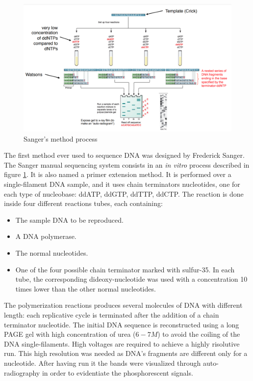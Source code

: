 \begin{figure}[h]
    \centering
    \includegraphics[width=\textwidth]{Sanger}
    \caption{Sanger's method process}
    \label{Sanger}
\end{figure}

The first method ever used to sequence DNA was designed by Frederick Sanger.
The Sanger manual sequencing system consists in an \textit{in vitro} process described in figure \ref{Sanger}.
It is also named a primer extension method.
It is performed over a single-filament DNA sample, and it uses chain terminators nucleotides, one for each type of nucleobase: ddATP, ddGTP, ddTTP, ddCTP.
The reaction is done inside four different reactions tubes, each containing:

\begin{multicols}{2}
    \begin{itemize}
        \item The sample DNA to be reproduced.
        \item A DNA polymerase.
        \item The normal nucleotides.
        \item One of the four possible chain terminator marked with sulfur-35.
            In each tube, the corresponding dideoxy-nucleotide was used with a concentration 10 times lower than the other normal nucleotides.
    \end{itemize}
\end{multicols}
The polymerization reactions produces several molecules of DNA with different length: each replicative cycle is terminated after the addition of a chain terminator nucleotide.
The initial DNA sequence is reconstructed using a long PAGE gel with high concentration of urea ($6 - 7 M$) to avoid the coiling of the DNA single-filaments.
High voltages are required to achieve a highly risolutive run.
This high resolution was needed as DNA's fragments are different only for a nucleotide.
After having run it the bands were visualized through auto-radiography in order to evidentiate the phosphorescent signals.


